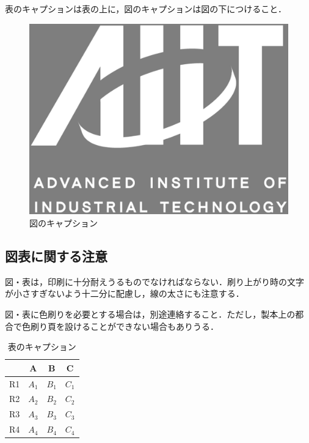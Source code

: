 \documentclass[a4j, 12Q, twocolumn, twoside]{jsarticle}
\begin{document}
表のキャプションは表の上に，図のキャプションは図の下につけること．

\begin{figure}
 \centering	%
 \includegraphics[height=9\baselineskip]{aiit_symbol.eps}
 \caption{図のキャプション}
 \label{fig:one}
\end{figure}

\subsection{図表に関する注意}
図・表は，印刷に十分耐えうるものでなければならない．刷り上がり時の文字
が小さすぎないよう十二分に配慮し，線の太さにも注意する．

図・表に色刷りを必要とする場合は，別途連絡すること．ただし，製本上の都
合で色刷り頁を設けることができない場合もありうる．

\begin{table}
 \centering
 \caption{表のキャプション}
 \begin{tabular}{c|ccc} \hline \hline
   & A & B & C \\ \hline
   R1 & $A_{1}$ & $B_{1}$ & $C_{1}$ \\
   R2 & $A_{2}$ & $B_{2}$ & $C_{2}$ \\
   R3 & $A_{3}$ & $B_{3}$ & $C_{3}$ \\
   R4 & $A_{4}$ & $B_{4}$ & $C_{4}$ \\ \hline
 \end{tabular}
 \vskip 10pt %
\end{table}
\end{document}
